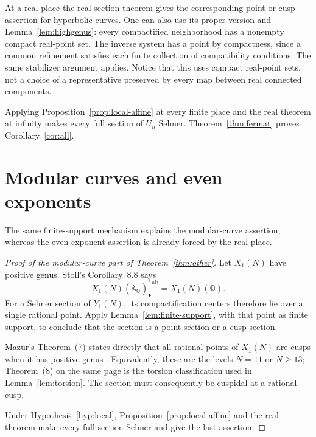 \documentclass[11pt,a4paper]{article}
\newcommand{\Q}{\mathbb Q}
\newcommand{\A}{\mathbb A}
\newcommand{\fab}{\mathrm{f\text{-}ab}}
\theoremstyle{plain}
\theoremstyle{definition}
\begin{document}
At a real place the real section theorem \citep[unnumbered Theorem, p.~2]{real} gives the corresponding
point-or-cusp assertion for hyperbolic curves. One can also use its
proper version and Lemma~\ref{lem:highgenus}: every compactified
neighborhood has a nonempty compact real-point set. The inverse
system has a point by compactness, since a common refinement
satisfies each finite collection of compatibility conditions. The
same stabilizer argument applies. Notice that this uses compact
real-point sets, not a choice of a representative preserved by every
map between real connected components.

Applying Proposition~\ref{prop:local-affine} at every finite place
and the real theorem at infinity makes every full section of $U_n$
Selmer. Theorem~\ref{thm:fermat} proves Corollary~\ref{cor:all}.

\section{Modular curves and even exponents}\label{sec:modulareven}

The same finite-support mechanism explains the modular-curve assertion,
whereas the even-exponent assertion is already forced by the real place.

\begin{proof}[Proof of the modular-curve part of Theorem~\ref{thm:other}]
Let $X_1(N)$ have positive genus. Stoll's Corollary~8.8 says
\[
 X_1(N)(\A_\Q)_\bullet^{\fab}=X_1(N)(\Q).
\]
For a Selmer section of $Y_1(N)$, its compactification centers
therefore lie over a single rational point. Apply
Lemma~\ref{lem:finite-support}, with that point as finite support,
to conclude that the section is a point section or a cusp section.

Mazur's Theorem~(7) states directly that all rational points of
$X_1(N)$ are cusps when it has positive genus
\citep[Theorem~(7), p.~35]{mazur}. Equivalently, these are the levels
$N=11$ or $N\geq13$; Theorem~(8) on the same page is the torsion
classification used in Lemma~\ref{lem:torsion}.
The section must consequently be cuspidal at a rational cusp.

Under Hypothesis~\ref{hyp:local},
Proposition~\ref{prop:local-affine} and the real theorem make
every full section Selmer and give the last assertion.
\end{proof}
\end{document}
